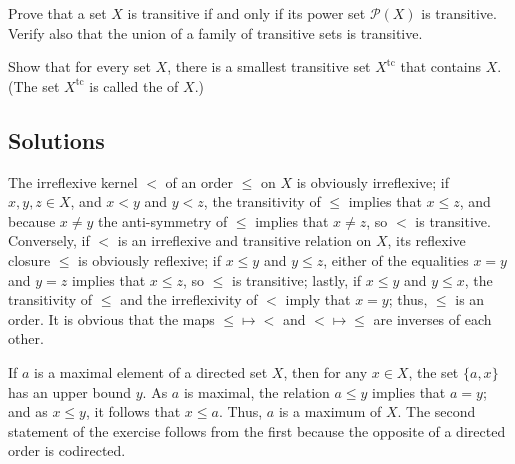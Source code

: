 \documentclass{article}
\begin{document}
\begin{exercise}
  \label{exe:565zdnmj}
  Prove that a set \(X\) is transitive if and only if its power set
  \(\mathcal{P}(X)\) is transitive.  Verify also that the union of a
  family of transitive sets is transitive.
\end{exercise}

\begin{exercise}
  \label{exe:v7uvzogi}
  Show that for every set \(X\), there is a smallest transitive set
  \(X^{\mathrm{tc}}\) that contains \(X\).  (The set
  \(X^{\mathrm{tc}}\) is called the  of
  \(X\).)
\end{exercise}

\subsection{Solutions}
\label{sec:fzhm4l61}

\begin{solution}[\ref{exe:eydusvz3}]
  \label{sol:bxkmo56h}
  The irreflexive kernel \(<\) of an order \(\leq\) on \(X\) is
  obviously irreflexive; if \(x,y,z \in X\), and \(x < y\) and
  \(y < z\), the transitivity of \(\leq\) implies that \(x \leq z\),
  and because \(x \neq y\) the anti-symmetry of \(\leq\) implies that
  \(x \neq z\), so \(<\) is transitive.  Conversely, if \(<\) is an
  irreflexive and transitive relation on \(X\), its reflexive closure
  \(\leq\) is obviously reflexive; if \(x \leq y\) and \(y \leq z\),
  either of the equalities \(x = y\) and \(y = z\) implies that
  \(x \leq z\), so \(\leq\) is transitive; lastly, if \(x \leq y\) and
  \(y \leq x\), the transitivity of \(\leq\) and the irreflexivity of
  \(<\) imply that \(x = y\); thus, \(\leq\) is an order.  It is
  obvious that the maps \(\leq \mapsto <\) and \(< \mapsto \leq\) are
  inverses of each other.
\end{solution}

\begin{solution}[\ref{exe:swjbrepg}]
  \label{sol:pcqde5hb}
  If \(a\) is a maximal element of a directed set \(X\), then for any
  \(x \in X\), the set \(\{ a, x \}\) has an upper bound \(y\).  As
  \(a\) is maximal, the relation \(a \leq y\) implies that \(a = y\);
  and as \(x \leq y\), it follows that \(x \leq a\).  Thus, \(a\) is a
  maximum of \(X\).  The second statement of the exercise follows from
  the first because the opposite of a directed order is codirected.
\end{solution}
\end{document}
